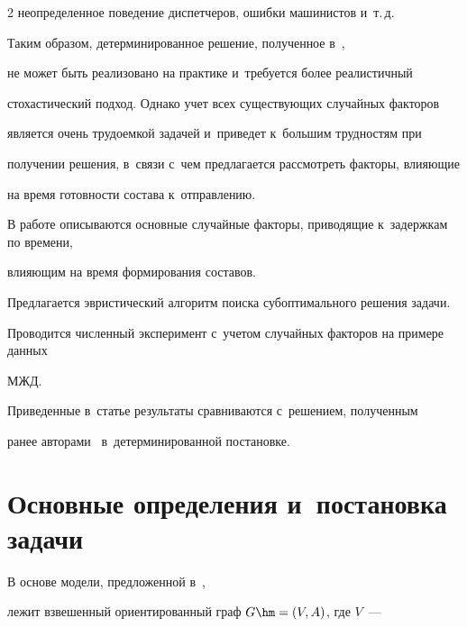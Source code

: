 \begin{multicols}{2}
неопределенное поведение диспетчеров, ошибки машинистов и~т.\,д. 


Таким образом, детерминированное решение, полученное в~\cite{AzanovBuyanov}, 


не может быть реализовано на практике и~требуется более реалистичный 


стохастический подход. Однако учет всех существующих случайных факторов 


является очень трудоемкой задачей и~приведет к~большим трудностям при 


получении решения, в~связи с~чем предлагается рассмотреть факторы, влияющие 


на время готовности состава к~отправлению.


    





В работе описываются основные случайные факторы, приводящие к~задержкам по времени,\linebreak


влияющим на время формирования составов.


Предлагается эвристический алгоритм поиска субоптимального решения задачи.


Проводится чис\-лен\-ный эксперимент с~учетом случайных факторов на примере данных 


МЖД.


Приведенные в~статье результаты сравниваются с~решением, полученным


ранее авторами~\cite{AzanovBuyanov} в~детерминированной по\-ста\-новке.





\vspace*{-12pt}





\section{Основные определения и~постановка задачи}





\vspace*{-6pt}





В основе модели, предложенной в~\cite{AzanovBuyanov},


лежит взвешенный ориентированный граф $G \hm= (V, A)$, где $V$~--- 



\end{multicols}
